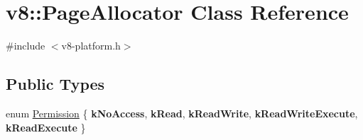 \hypertarget{classv8_1_1PageAllocator}{}\section{v8\+:\+:Page\+Allocator Class Reference}
\label{classv8_1_1PageAllocator}


{\ttfamily \#include $<$v8-\/platform.\+h$>$}

\subsection*{Public Types}
\begin{DoxyCompactItemize}
\item 
enum \mbox{\hyperlink{classv8_1_1PageAllocator_a88f74b164fe97e053259f67a95758415}{Permission}} \{ \newline
{\bfseries k\+No\+Access}, 
{\bfseries k\+Read}, 
{\bfseries k\+Read\+Write}, 
{\bfseries k\+Read\+Write\+Execute}, 
\newline
{\bfseries k\+Read\+Execute}
 \}
\end{DoxyCompactItemize}
